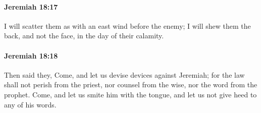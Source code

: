 		\paragraph{Jeremiah 18:17} %
			\label{JEREMIAH-18-17}

			I will scatter them as with an east wind before the enemy; I will shew them the back, and not the face, in the day of their calamity.


		\paragraph{Jeremiah 18:18} %
			\label{JEREMIAH-18-18}

			Then said they, Come, and let us devise devices against Jeremiah; for the law shall not perish from the priest, nor counsel from the wise, nor the word from the prophet. Come, and let us smite him with the tongue, and let us not give heed to any of his words.

